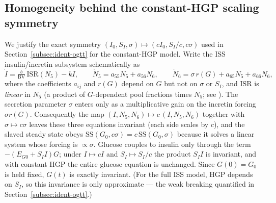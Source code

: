 \subsection{Homogeneity behind the constant-HGP scaling symmetry}
\label{app:obs-ogtt-sym}

We justify the exact symmetry $(I_0,S_I,\sigma)\mapsto(cI_0,S_I/c,c\sigma)$ used in Section~\ref{subsec:ident-ogtt}
for the constant-HGP model. Write the ISS insulin/incretin subsystem schematically as
\[
\dot I = \tfrac{b}{\mathrm{BV}}\,\mathrm{ISR}(N_5) - kI,\qquad
\dot N_5 = a_{55}N_5 + a_{56}N_6,\qquad
\dot N_6 = \sigma\,r(G) + a_{65}N_5 + a_{66}N_6,
\]
where the coefficients $a_{ij}$ and $r(G)$ depend on $G$ but not on $\sigma$ or $S_I$, and $\mathrm{ISR}$ is
\emph{linear} in $N_5$ (a product of $G$-dependent pool fractions times $N_5$; see ).
The secretion parameter $\sigma$ enters only as a multiplicative gain on the incretin forcing $\sigma r(G)$.
Consequently the map $(I,N_5,N_6)\mapsto c\,(I,N_5,N_6)$ together with $\sigma\mapsto c\sigma$ leaves these
three equations invariant (each side scales by $c$), and the slaved steady state obeys
$\mathrm{SS}(G_0,c\sigma)=c\,\mathrm{SS}(G_0,\sigma)$ because it solves a linear system whose forcing is
$\propto\sigma$. Glucose couples to insulin only through the term $-(E_{G0}+S_I I)G$; under $I\mapsto cI$ and
$S_I\mapsto S_I/c$ the product $S_I I$ is invariant, and with constant HGP the entire glucose equation is
unchanged. Since $G(0)=G_0$ is held fixed, $G(t)$ is exactly invariant. (For the full ISS model, HGP depends on
$S_I$, so this invariance is only approximate --- the weak breaking quantified in Section~\ref{subsec:ident-ogtt}.)